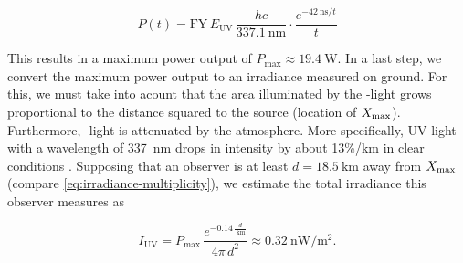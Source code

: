 \begin{equation}
\label{eq:irradiance-power}
P(t)= \text{FY}\,E_\text{UV}\,\frac{hc}{\SI{337.1}{\nano\meter}} \cdot\frac{e^{-\SI{42}{\nano\second}/t}}{t}   
\end{equation}

This results in a maximum power output of $P_\text{max}\approx\SI{19.4}{\watt}$. 
In a last step, we convert the maximum power output to an irradiance measured on
ground. For this, we must take into acount that the area illuminated by the 
\UV-light grows proportional to the distance squared to the source (location of 
$X_\mathrm{max}$). Furthermore, \UV-light is attenuated by the atmosphere. More 
specifically, UV light with a wavelength of \SI{337}{\nano\meter} drops in 
intensity by about 13\%/km in clear conditions 
\cite[see Fig. 83 on page 103 of][]{Baum1950}. Supposing that an observer is at
least $d=\SI{18.5}{\kilo\meter}$ away from $X_\mathrm{max}$ (compare 
\cref{eq:irradiance-multiplicity}), we estimate the total irradiance this 
observer measures as

\begin{equation}
\label{eq:irradiance}
I_\text{UV} = P_\text{max}\,\frac{e^{-0.14\,\frac{d}{\SI{}{\kilo\meter}}}}{4\pi\,d^2}\approx\SI{0.32}{\nano\watt\per\square\meter}.
\end{equation}
